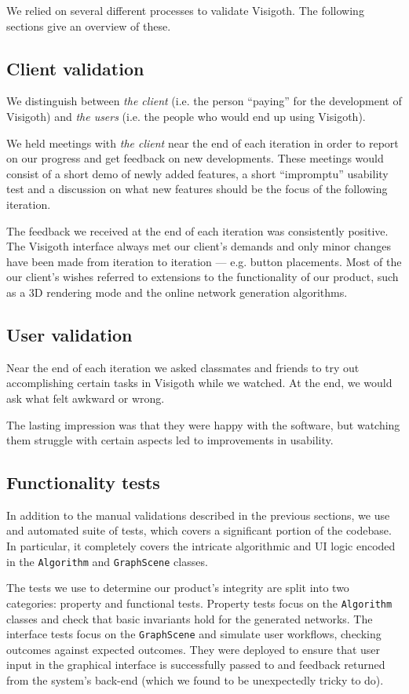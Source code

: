 \documentclass[a4paper,11pt,titlepage]{article}
\newcommand{\code}[1]{\texttt{#1}}
\begin{document}
We relied on several different processes to validate Visigoth. The
following sections give an overview of these.

\subsection{Client validation}
We distinguish between \emph{the client} (i.e. the person ``paying''
for the development of Visigoth) and \emph{the users} (i.e. the people
who would end up using Visigoth).

We held meetings with \emph{the client} near the end of each iteration
in order to report on our progress and get feedback on new
developments. These meetings would consist of a short demo of newly
added features, a short ``impromptu'' usability test and a discussion
on what new features should be the focus of the following iteration.

The feedback we received at the end of each iteration was consistently
positive. The Visigoth interface always met our client's demands and
only minor changes have been made from iteration to iteration ---
e.g. button placements. Most of the our client's wishes referred to
extensions to the functionality of our product, such as a 3D rendering
mode and the online network generation algorithms.

\subsection{User validation}
Near the end of each iteration we asked classmates and friends to try
out accomplishing certain tasks in Visigoth while we watched. At the
end, we would ask what felt awkward or wrong.

The lasting impression was that they were happy with the software, but
watching them struggle with certain aspects led to improvements in
usability.

\subsection{Functionality tests}
\label{tests}

In addition to the manual validations described in the previous
sections, we use and automated suite of tests, which covers a
significant portion of the codebase. In particular, it completely
covers the intricate algorithmic and UI logic encoded in the
\code{Algorithm} and \code{GraphScene} classes.

The tests we use to determine our product's integrity are split into
two categories: property and functional tests. Property tests focus on
the \code{Algorithm} classes and check that basic invariants hold for
the generated networks. The interface tests focus on the
\code{GraphScene} and simulate user workflows, checking outcomes
against expected outcomes. They were deployed to ensure that user
input in the graphical interface is successfully passed to and
feedback returned from the system's back-end (which we found to be
unexpectedly tricky to do).
\end{document}
